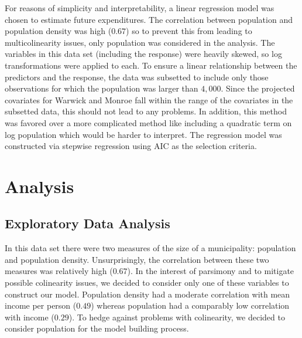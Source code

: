 \documentclass{article}\usepackage[]{graphicx}\usepackage[]{color}
\begin{document}
For reasons of simplicity and interpretability, a linear regression model was chosen to estimate future expenditures. The correlation between population and population density was high ($0.67$) so to prevent this from leading to multicolinearity issues, only population was considered in the analysis. The variables in this data set (including the response) were heavily skewed, so log transformations were applied to each. To ensure a linear relationship between the predictors and the response, the data was subsetted to include only those observations for which the population was larger than $4,000$. Since the projected covariates for Warwick and Monroe fall within the range of the covariates in the subsetted data, this should not lead to any problems. In addition, this method was favored over a more complicated method like including a quadratic term on log population which would be harder to interpret. The regression model was constructed via stepwise regression using AIC as the selection criteria.



\section{Analysis} \label{analysis}




\subsection{Exploratory Data Analysis} \label{eda}

In this data set there were two measures of the size of a municipality: population and population density. Unsurprisingly, the correlation between these two measures was relatively high ($0.67$). In the interest of parsimony and to mitigate possible colinearity issues, we decided to consider only one of these variables to construct our model. Population density had a moderate correlation with mean income per person ($0.49$) whereas population had a comparably low correlation with income ($0.29$). To hedge against problems with colinearity, we decided to consider population for the model building process.
\end{document}

